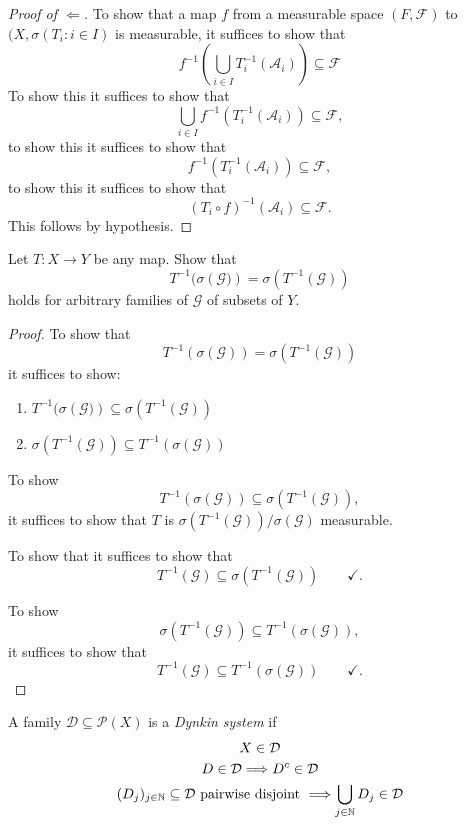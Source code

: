 \begin{proof}[Proof of $\Longleftarrow$]
To show that a map \(f\) from a measurable space \((F,\mathcal{F})\) to \((X,\sigma (T_{i}:i\in I)\) is measurable, it suffices to show that
\[
f^{-1}(\bigcup _{i\in I}T_{i}^{-1}(\mathcal{A}_{i}))\subseteq \mathcal{F}
\]
To show this it suffices to show that
\[
\bigcup _{i\in I}f^{-1}(T_{i}^{-1}(\mathcal{A}_{i}))\subseteq \mathcal{F},
\]
to show this it suffices to show that
\[
f^{-1}(T_{i}^{-1}(\mathcal{A}_{i}))\subseteq \mathcal{F},
\]
to show this it suffices to show that
\[
(T_{i}\circ f)^{-1}(\mathcal{A}_{i})\subseteq \mathcal{F}.
\]
This follows by hypothesis.
\end{proof}

\begin{thm}[Problem 7.8]
Let \(T:X\rightarrow Y\) be any map. Show that
\[
T^{-1}(\sigma (\mathcal{G)})=\sigma (T^{-1}(\mathcal{G}))
\]
holds for arbitrary families of \(\mathcal{G}\) of subsets of \(Y\).
\end{thm}

\begin{proof}
To show that
\[
T^{-1}(\sigma (\mathcal{G}))=\sigma (T^{-1}(\mathcal{G}))
\]
it suffices to show:

\begin{enumerate}
  \item \(T^{-1}(\sigma (\mathcal{G)})\subseteq \sigma (T^{-1}(\mathcal{G}))\)
  \item \(\sigma (T^{-1}(\mathcal{G}))\subseteq T^{-1}(\sigma (\mathcal{G}))\)
\end{enumerate}

To show
\[
T^{-1}(\sigma (\mathcal{G}))\subseteq \sigma (T^{-1}(\mathcal{G})),
\]
it suffices to show that
\(T\) is \(\sigma (T^{-1}(\mathcal{G}))/\sigma (\mathcal{G})\) measurable.

To show that it suffices to show that
\[
T^{-1}(\mathcal{G})\subseteq \sigma (T^{-1}(\mathcal{G})) \qquad \checkmark.
\]

To show
\[
\sigma (T^{-1}(\mathcal{G}))\subseteq T^{-1}(\sigma (\mathcal{G})),
\]
it suffices to show that
\[
T^{-1}(\mathcal{G})\subseteq T^{-1}(\sigma (\mathcal{G})) \qquad \checkmark.
\]
\end{proof}

\begin{defn}
A family \(\mathcal{D}\subseteq \mathcal{P}(X)\) is a \emph{Dynkin system} if
\begin{gather*}
X\in \mathcal{D} \\
D\in \mathcal{D}\space \Longrightarrow \space D^c\in \mathcal{D} \\
(D_{j})_{j\in \Bbb{N}}\subseteq \mathcal{D} \text{ pairwise disjoint }\space \Longrightarrow \space \bigcup _{j\in \Bbb{N}}D_{j}\in \mathcal{D}
\end{gather*}
\end{defn}

